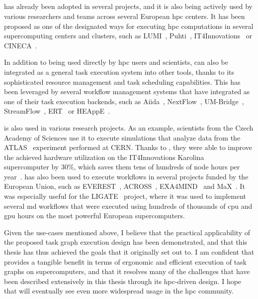 \subsection*{\hyperqueue{}}
\hyperqueue{} has already been adopted in several projects, and it is also being
actively used by various researchers and teams across several European \gls{hpc}
centers. It has been proposed as one of the designated ways for executing
\gls{hpc} computations in several supercomputing centers and clusters, such as
LUMI~\cite{it4i-lumi}, Puhti~\cite{puhti-hq},
IT4Innovations~\cite{it4i-hq} or CINECA~\cite{cineca}.

In addition to being used directly by \gls{hpc} users and scientists,
\hyperqueue{} can also be integrated as a general task execution system into other
tools, thanks to its sophisticated resource management and task scheduling capabilities. This has
been leveraged by several workflow management systems that have integrated
\hyperqueue{} as one of their task execution backends, such as
Aiida~\cite{aiida-hq}, NextFlow~\cite{nextflow-hq},
UM-Bridge~\cite{umbridge}, StreamFlow~\cite{streamflow-hq},
ERT~\cite{ert} or HEAppE~\cite{heappe}.

\hyperqueue{} is also used in various research projects. As an example,
scientists from the Czech Academy of Sciences use it to execute simulations that analyze data from the
ATLAS~\cite{atlas} experiment performed at CERN. Thanks to \hyperqueue{}, they were able to improve
the achieved hardware utilization on the IT4Innovations
Karolina~\cite{karolina} supercomputer by 30\%, which saves them tens of hundreds of node hours per
year~\cite{cern-hq}.
\hyperqueue{} has also been used to execute workflows in several projects funded by
the European Union, such as EVEREST~\cite{everest}, ACROSS~\cite{across},
EXA4MIND~\cite{exa4mind} and MaX~\cite{max}. It was especially useful
for the LIGATE~\cite{ligate} project, where it was used to implement several
\gls{md} workflows that were executed using hundreds of thousands of
\gls{cpu} and \gls{gpu} hours on the most powerful European
supercomputers.

Given the use-cases mentioned above, I believe that the practical applicability of the proposed
task graph execution design has been demonstrated, and that this thesis has thus achieved the goals
that it originally set out to. I am confident that \hyperqueue{} provides a tangible
benefit in terms of ergonomic and efficient execution of task graphs on supercomputers, and that it
resolves many of the challenges that have been described extensively in this thesis through its
\gls{hpc}-driven design. I hope that \hyperqueue{} will eventually
see even more widespread usage in the \gls{hpc} community.
